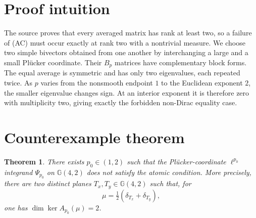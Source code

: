 \documentclass[11pt]{article}
\newtheorem{theorem}{Theorem}
\newcommand{\G}{\mathbb{G}}
\begin{document}
\section{Proof intuition}

The source proves that every averaged matrix has rank at least two, so a
failure of (AC) must occur exactly at rank two with a nontrivial measure.  We
choose two simple bivectors obtained from one another by interchanging a large
and a small Pl\"ucker coordinate.  Their $B_p$ matrices have complementary
block forms.  The equal average is symmetric and has only two eigenvalues,
each repeated twice.  As $p$ varies from the nonsmooth endpoint $1$ to the
Euclidean exponent $2$, the smaller eigenvalue changes sign.  At an interior
exponent it is therefore zero with multiplicity two, giving exactly the
forbidden non-Dirac equality case.

\section{Counterexample theorem}

\begin{theorem}\label{thm:main}
There exists $p_0\in(1,2)$ such that the Pl\"ucker-coordinate $\ell^{p_0}$
integrand $\Psi_{p_0}$ on $\G(4,2)$ does not satisfy the atomic condition.
More precisely, there are two distinct planes $T_x,T_y\in\G(4,2)$ such that,
for
\[
 \mu=\tfrac12(\delta_{T_x}+\delta_{T_y}),
\]
one has $\dim\ker A_{p_0}(\mu)=2$.
\end{theorem}
\end{document}
